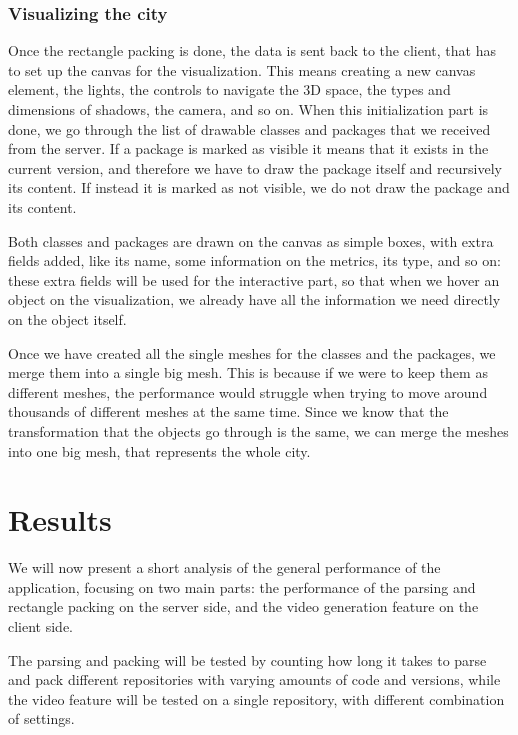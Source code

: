 \documentclass[]{usiinfbachelorproject}
\begin{document}
\subsubsection{Visualizing the city} \label{Visualizing the city}
Once the rectangle packing is done, the data is sent back to the client, that has to set up the canvas for the visualization. This means creating a new canvas element, the lights, the controls to navigate the 3D space, the types and dimensions of shadows, the camera, and so on.
When this initialization part is done, we go through the list of drawable classes and packages that we received from the server. If a package is marked as visible it means that it exists in the current version, and therefore we have to draw the package itself and recursively its content. If instead it is marked as not visible, we do not draw the package and its content.

Both classes and packages are drawn on the canvas as simple boxes, with extra fields added, like its name, some information on the metrics, its type, and so on: these extra fields will be used for the interactive part, so that when we hover an object on the visualization, we already have all the information we need directly on the object itself.

Once we have created all the single meshes for the classes and the packages, we merge them into a single big mesh.
This is because if we were to keep them as different meshes, the performance would struggle when trying to move around thousands of different meshes at the same time. Since we know that the transformation that the objects go through is the same, we can merge the meshes into one big mesh, that represents the whole city.

\section{Results} \label{Results}

We will now present a short analysis of the general performance of the application, focusing on two main parts: the performance of the parsing and rectangle packing on the server side, and the video generation feature on the client side.

The parsing and packing will be tested by counting how long it takes to parse and pack different repositories with varying amounts of code and versions, while the video feature will be tested on a single repository, with different combination of settings.
\end{document}
